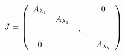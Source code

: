 \documentclass{article}
\begin{document}
\begin{preview}
$
  J =
    \left(
      \begin{array}{*4{c}}
        A_{\lambda_1} &               &        & 0\\
                      & A_{\lambda_2} &        &  \\
                      &               & \ddots &  \\
           0          &               &        & A_{\lambda_k}
      \end{array}
    \right)
$
\end{preview}
\end{document}
